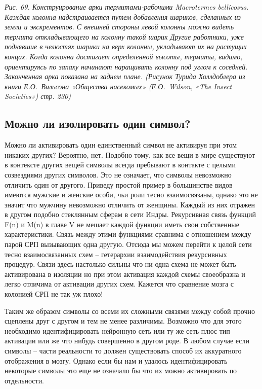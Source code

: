 \documentclass[../main.tex]{subfiles}
\begin{document}
\emph{Рис. 69. Конструирование арки термитами-рабочими Macrotermes bellicosus. Каждая колонна надстраивается путем добавления шариков, сделанных из земли и экскрементов. С внешней стороны левой колонны можно видеть термита откладывающего на колонну такой шарик Другие работники, уже поднявшие в челюстях шарики на верх колонны, укладывают их на растущих концах. Когда колонна достигает определенной высоты, термиты, видимо, ориентируясь по запаху начинают наращивать колонну под углом к соседней. Законченная арка показана на заднем плане. (Рисунок Турида Холлдоблера из книги Е.О.~Вильсона «Общества насекомых» (Е.О.~Wilson, «The Insect Societies») стр. 230)}


\subsection{Можно ли изолировать один символ?}

Можно ли активировать один единственный символ не активируя при этом никаких других? Вероятно, нет. Подобно тому, как все вещи в мире существуют в контексте других вещей символы всегда пребывают в контакте с целыми созвездиями других символов. Это не означает, что символы невозможно отличить один от другого. Приведу простой пример в большинстве видов имеются мужские и женские особи, чьи роли тесно взаимосвязаны, однако это не значит что мужчину невозможно отличить от женщины. Каждый из них отражен в другом подобно стеклянным сферам в сети Индры. Рекурсивная связь функций F(n) и M(n) в главе V не мешает каждой функции иметь свои собственные характеристики. Связь между этими функциями сравнима с отношением между парой СРП вызывающих одна другую. Отсюда мы можем перейти к целой сети тесно взаимосвязанных схем \--- гетерархии взаимодействия рекурсивных процедур. Связи здесь настолько сильны что ни одна схема не может быть активирована в изоляции но при этом активация каждой схемы своеобразна и легко отличима от активации других схем. Кажется что сравнение мозга с колонией СРП не так уж плохо!

Таким же образом символы со всеми их сложными связями между собой прочно сцеплены друг с другом и тем не менее различимы. Возможно что для этого необходимо идентифицировать нейронную сеть или ту же сеть плюс тип активации или же что нибудь совершенно в другом роде. В любом случае если символы \--- части реальности то должен существовать способ их аккуратного отображения в мозгу. Однако если бы нам и удалось идентифицировать некоторые символы это еще не означало бы что их можно активировать по отдельности.
\end{document}
